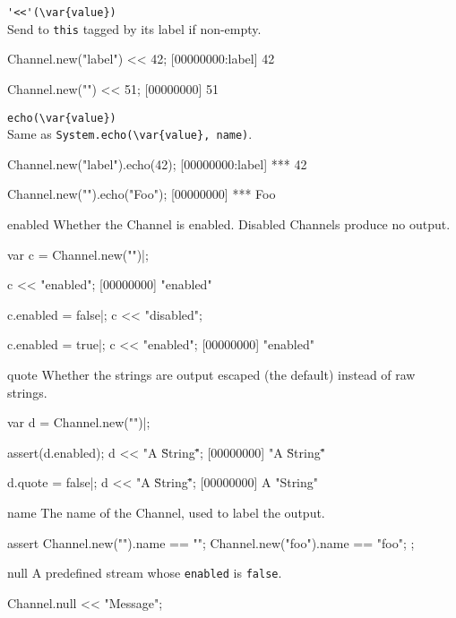 \begin{urbiscriptapi}
\item \lstinline|'<<'(\var{value})|\\
  Send  to \lstinline|this| tagged by its label if non-empty.

\begin{urbiscript}
Channel.new("label") << 42;
[00000000:label] 42

Channel.new("") << 51;
[00000000] 51
\end{urbiscript}

\item \lstinline|echo(\var{value})|\\
  Same as \lstinline|System.echo(\var{value}, name)|.

\begin{urbiscript}
Channel.new("label").echo(42);
[00000000:label] *** 42

Channel.new("").echo("Foo");
[00000000] *** Foo
\end{urbiscript}

\item[enabled] Whether the Channel is enabled.  Disabled Channels
  produce no output.
\begin{urbiscript}
var c = Channel.new("")|;

c << "enabled";
[00000000] "enabled"

c.enabled = false|;
c << "disabled";

c.enabled = true|;
c << "enabled";
[00000000] "enabled"
\end{urbiscript}

\item[quote] Whether the strings are output escaped (the default)
  instead of raw strings.
\begin{urbiscript}
var d = Channel.new("")|;

assert(d.enabled);
d << "A \"String\"";
[00000000] "A \"String\""

d.quote = false|;
d << "A \"String\"";
[00000000] A "String"
\end{urbiscript}

\item[name] The name of the Channel, used to label the output.
\begin{urbiscript}
assert
{
  Channel.new("").name == "";
  Channel.new("foo").name == "foo";
};
\end{urbiscript}

\item[null] A predefined stream whose \lstinline|enabled| is
  \lstinline|false|.
\begin{urbiscript}
Channel.null << "Message";
\end{urbiscript}



\end{urbiscriptapi}
